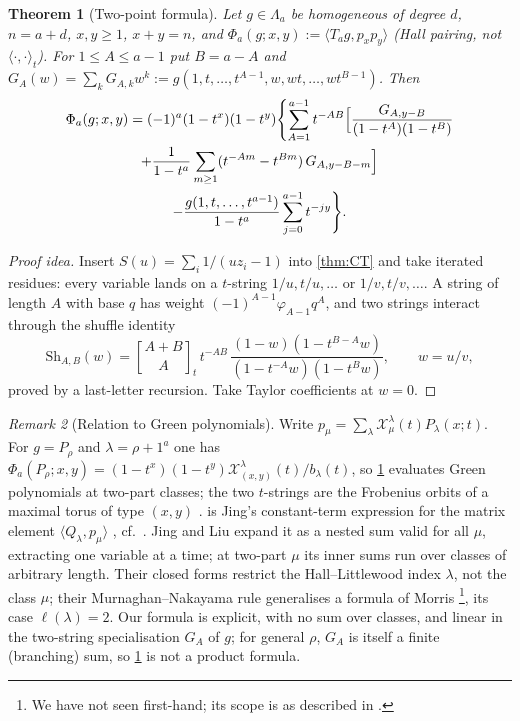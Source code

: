 \documentclass[submission]{FPSAC2027}
\newtheorem{theorem}{Theorem}[section]
\theoremstyle{definition}
\theoremstyle{remark}
\newtheorem{remark}[theorem]{Remark}
\newcommand{\Lam}{\Lambda}
\newcommand{\qbin}[2]{\genfrac{[}{]}{0pt}{}{#1}{#2}_t}
\begin{document}
\begin{theorem}[Two-point formula]\label{thm:2pt}
Let $g\in\Lam_a$ be homogeneous of degree $d$, $n=a+d$, $x,y\ge1$, $x+y=n$, and $\Phi_a(g;x,y):=\langle T_ag,p_xp_y\rangle$ (Hall pairing, not $\langle\cdot,\cdot\rangle_t$). For $1\le A\le a-1$ put $B=a-A$ and $G_A(w)=\sum_kG_{A,k}w^k:=g(1,t,\dots,t^{A-1},w,wt,\dots,wt^{B-1})$. Then
\begin{multline*}
\Phi_a(g;x,y)=(-1)^a(1-t^x)(1-t^y)\Biggl\{\sum_{A=1}^{a-1}t^{-AB}\Bigl[\frac{G_{A,y-B}}{(1-t^A)(1-t^B)}\\+\frac{1}{1-t^a}\sum_{m\ge1}(t^{-Am}-t^{Bm})\,G_{A,y-B-m}\Bigr]\\
-\frac{g(1,t,\dots,t^{a-1})}{1-t^a}\sum_{j=0}^{a-1}t^{-jy}\Biggr\}.
\end{multline*}
\end{theorem}
\begin{proof}[Proof idea]
Insert $S(u)=\sum_i1/(uz_i-1)$ into \cref{thm:CT} and take iterated residues: every variable lands on a $t$-string $1/u,t/u,\dots$ or $1/v,t/v,\dots$. A string of length $A$ with base $q$ has weight $(-1)^{A-1}\varphi_{A-1}q^A$, and two strings interact through the shuffle identity
\[ \mathrm{Sh}_{A,B}(w)=\qbin{A+B}{A}\,t^{-AB}\,\frac{(1-w)(1-t^{B-A}w)}{(1-t^{-A}w)(1-t^Bw)},\qquad w=u/v, \]
proved by a last-letter recursion. Take Taylor coefficients at $w=0$.
\end{proof}
\begin{remark}[Relation to Green polynomials]
Write $p_\mu=\sum_\lambda \mathcal X^\lambda_\mu(t)P_\lambda(x;t)$. For $g=P_\rho$ and $\lambda=\rho+1^a$ one has $\Phi_a(P_\rho;x,y)=(1-t^x)(1-t^y)\mathcal X^{\lambda}_{(x,y)}(t)/b_\lambda(t)$, so \cref{thm:2pt} evaluates Green polynomials at two-part classes; the two $t$-strings are the Frobenius orbits of a maximal torus of type $(x,y)$ \cite{Green55}.  is Jing's constant-term expression for the matrix element $\langle Q_\lambda,p_\mu\rangle$ \cite{Jing91}, cf.\ \cite[(2.17), (2.20)]{JingLiu21}. Jing and Liu \cite[Thm.~2.7]{JingLiu21} expand it as a nested sum valid for all $\mu$, extracting one variable at a time; at two-part $\mu$ its inner sums run over classes of arbitrary length. Their closed forms \cite[Thm.~2.10, (2.37)--(2.40)]{JingLiu21} restrict the Hall--Littlewood index $\lambda$, not the class $\mu$; their Murnaghan--Nakayama rule \cite[Thm.~3.2]{JingLiu21} generalises a formula of Morris \cite{Morris77}\footnote{We have not seen \cite{Morris77} first-hand; its scope is as described in \cite[p.~12, before Thm.~3.2]{JingLiu21}.}, its case $\ell(\lambda)=2$. Our formula is explicit, with no sum over classes, and linear in the two-string specialisation $G_A$ of $g$; for general $\rho$, $G_A$ is itself a finite (branching) sum, so \cref{thm:2pt} is not a product formula.
\end{remark}
\end{document}

